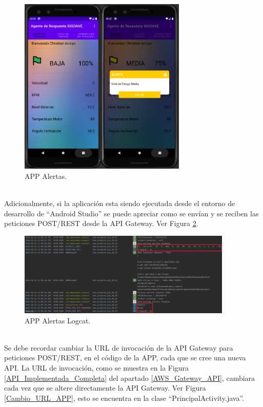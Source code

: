 \documentclass[a4paper,10pt, oneside, titlepage]{article}
\begin{document}
	\begin{figure}[!h]
		\centering
		\includegraphics[width = 1\linewidth, height = 8.5cm]{APP_Alertas.png}
		\caption{APP Alertas.}
		\label{APP_Alertas}
	\end{figure} \\
	\indent Adicionalmente, si la aplicación esta siendo ejecutada desde el entorno de desarrollo de ``Android Studio'' se puede apreciar como se envían y se reciben las peticiones POST/REST desde la API Gateway. Ver Figura \ref{APP_Alertas_Logcat}.
	\begin{figure}[!h]
		\centering
		\includegraphics[width = 1\linewidth, height = 4cm]{APP_Alertas_Logcat.png}
		\caption{APP Alertas Logcat.}
		\label{APP_Alertas_Logcat}
	\end{figure} \\
	\indent Se debe recordar cambiar la URL de invocación de la API Gateway para peticiones POST/REST, en el código de la APP, cada que se cree una nueva API. La URL de invocación, como se muestra en la Figura \ref{API_Implementada_Completa} del apartado \ref{AWS_Gateway_API}, cambiara cada vez que se altere directamente la API Gateway. Ver Figura \ref{Cambio_URL_APP}, esto se encuentra en la clase ``PrincipalActivity.java''.
\end{document}
